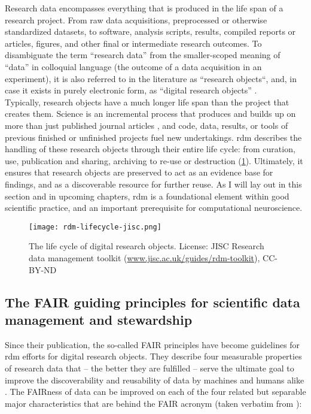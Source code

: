 Research data encompasses everything that is produced in the life span of a research project.
From raw data acquisitions, preprocessed or otherwise standardized datasets, to software, analysis scripts, results, compiled reports or articles, figures, and other final or intermediate research outcomes.
To disambiguate the term ``research data'' from the smaller-scoped meaning of ``data'' in colloquial language (the outcome of a data acquisition in an experiment), it is also referred to in the literature as ``research objects``, and, in case it exists in purely electronic form, as ``digital research objects'' \citep{bechhofer2010research}. \\
Typically, research objects have a much longer life span than the project that creates them.
Science is an incremental process that produces and builds up on more than just published journal articles \citep{mons2018data}, and code, data, results, or tools of previous finished or unfinished projects fuel new undertakings.
\gls{rdm} describes the handling of these research objects through their entire life cycle: from curation, use, publication and sharing, archiving to re-use or destruction (\cref{fig:rdm-lifecycle}).
Ultimately, it ensures that research objects are preserved to act as an evidence base for findings, and as a discoverable resource for further reuse.
As I will lay out in this section and in upcoming chapters, \gls{rdm} is a foundational element within good scientific practice, and an important prerequisite for computational neuroscience.


\begin{figure}
	\centering
	\texttt{[image: rdm-lifecycle-jisc.png]}
	\caption[The life cycle of digital research objects]{The life cycle of digital research objects. License: JISC Research data management toolkit (\href{https://www.jisc.ac.uk/guides/rdm-toolkit}{www.jisc.ac.uk/guides/rdm-toolkit}), CC-BY-ND}
	\label{fig:rdm-lifecycle}
\end{figure}


\subsection{The FAIR guiding principles for scientific data management and stewardship}

Since their publication, the so-called \gls{FAIR} principles \citep{wilkinson2016fair} have become guidelines for \gls{rdm} efforts for digital research objects.
They describe four measurable properties of research data that -- the better they are fulfilled -- serve the ultimate goal to improve the discoverability and reusability of data by machines and humans alike \citep{wilkinson2016fair}.
The \gls{FAIR}ness of data can be improved on each of the four related but separable major characteristics that are behind the \gls{FAIR} acronym (taken verbatim from \citet{wilkinson2016fair}):

